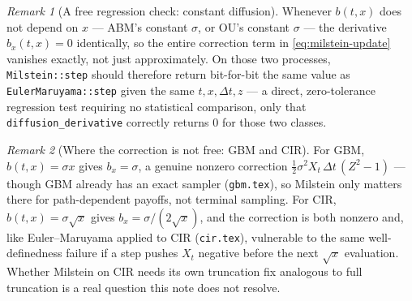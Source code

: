 \documentclass[11pt]{article}
\newcommand{\diff}{b}
\theoremstyle{plain}
\theoremstyle{definition}
\theoremstyle{remark}
\newtheorem{remark}{Remark}
\begin{document}
\begin{remark}[A free regression check: constant diffusion]\label{rem:milstein-degenerate}
Whenever $\diff(t,x)$ does not depend on $x$ --- ABM's constant
$\sigma$, or OU's constant $\sigma$ --- the derivative
$\diff_x(t,x)=0$ identically, so the entire correction term in
\eqref{eq:milstein-update} vanishes exactly, not just
approximately. On those two processes, \texttt{Milstein::step} should
therefore return bit-for-bit the same value as
\texttt{EulerMaruyama::step} given the same $t,x,\Delta t,z$ ---
a direct, zero-tolerance regression test requiring no statistical
comparison, only that \texttt{diffusion\_derivative} correctly returns
$0$ for those two classes.
\end{remark}

\begin{remark}[Where the correction is not free: GBM and CIR]
For GBM, $\diff(t,x)=\sigma x$ gives $\diff_x=\sigma$, a genuine
nonzero correction $\tfrac12\sigma^2 X_t\,\Delta t\,(Z^2-1)$ --- though
GBM already has an exact sampler (\texttt{gbm.tex}), so Milstein only
matters there for path-dependent payoffs, not terminal sampling. For
CIR, $\diff(t,x)=\sigma\sqrt{x}$ gives
$\diff_x=\sigma/(2\sqrt{x})$, and the correction is both nonzero and,
like Euler--Maruyama applied to CIR (\texttt{cir.tex}), vulnerable to
the same well-definedness failure if a step pushes $X_t$ negative
before the next $\sqrt{x}$ evaluation. Whether Milstein on CIR needs
its own truncation fix analogous to full truncation is a real
question this note does not resolve.
\end{remark}




\end{document}
